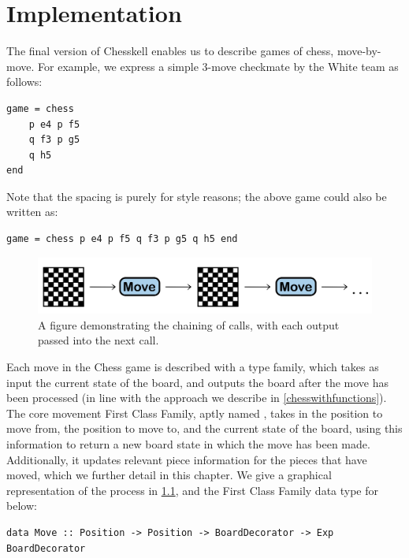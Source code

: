 \chapter{Implementation} \label{examplegame}

The final version of Chesskell enables us to describe games of chess, move-by-move. For example, we express a simple 3-move checkmate by the White team as follows:

\begin{lstlisting}
game = chess
    p e4 p f5
    q f3 p g5
    q h5
end
\end{lstlisting}

Note that the spacing is purely for style reasons; the above game could also be written as:

\begin{lstlisting}
game = chess p e4 p f5 q f3 p g5 q h5 end
\end{lstlisting}

\begin{figure}
    \centering
    \includegraphics[width=\textwidth,keepaspectratio]{Movefigure.png}
    \caption{A figure demonstrating the chaining of  calls, with each output  passed into the next call.}
    \label{movefigure}
\end{figure}

Each move in the Chess game is described with a type family, which takes as input the current state of the board, and outputs the board after the move has been processed (in line with the approach we describe in \cref{chesswithfunctions}). The core movement First Class Family, aptly named , takes in the position to move from, the position to move to, and the current state of the board, using this information to return a new board state in which the move has been made. Additionally, it updates relevant piece information for the pieces that have moved, which we further detail in this chapter. We give a graphical representation of the process in \cref{movefigure}, and the First Class Family data type for  below:

\begin{lstlisting}
data Move :: Position -> Position -> BoardDecorator -> Exp BoardDecorator
\end{lstlisting}

